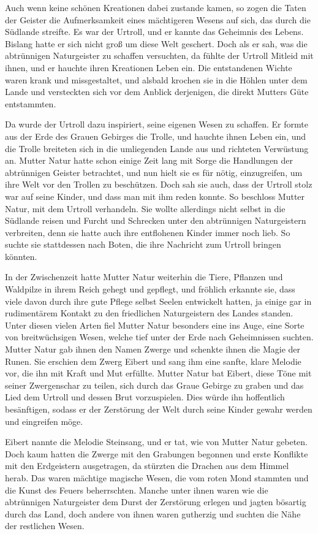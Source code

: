 \documentclass[10pt, a4paper, oneside]{book}
\begin{document}
Auch wenn keine schönen Kreationen dabei zustande kamen, so zogen die Taten der Geister die Aufmerksamkeit eines mächtigeren Wesens auf sich, das durch die Südlande streifte. Es war der Urtroll, und er kannte das Geheimnis des Lebens. Bislang hatte er sich nicht groß um diese Welt geschert. Doch als er sah, was die abtrünnigen Naturgeister zu schaffen versuchten, da fühlte der Urtroll Mitleid mit ihnen, und er hauchte ihren Kreationen Leben ein. Die entstandenen Wichte waren krank und missgestaltet, und alsbald krochen sie in die Höhlen unter dem Lande und versteckten sich vor dem Anblick derjenigen, die direkt Mutters Güte entstammten.

Da wurde der Urtroll dazu inspiriert, seine eigenen Wesen zu schaffen. Er formte aus der Erde des Grauen Gebirges die Trolle, und hauchte ihnen Leben ein, und die Trolle breiteten sich in die umliegenden Lande aus und richteten Verwüstung an. Mutter Natur hatte schon einige Zeit lang mit Sorge die Handlungen der abtrünnigen Geister betrachtet, und nun hielt sie es für nötig, einzugreifen, um ihre Welt vor den Trollen zu beschützen. Doch sah sie auch, dass der Urtroll stolz war auf seine Kinder, und dass man mit ihm reden konnte. So beschloss Mutter Natur, mit dem Urtroll verhandeln. Sie wollte allerdings nicht selbst in die Südlande reisen und Furcht und Schrecken unter den abtrünnigen Naturgeistern verbreiten, denn sie hatte auch ihre entflohenen Kinder immer noch lieb. So suchte sie stattdessen nach Boten, die ihre Nachricht zum Urtroll bringen könnten.

In der Zwischenzeit hatte Mutter Natur weiterhin die Tiere, Pflanzen und Waldpilze in ihrem Reich gehegt und gepflegt, und fröhlich erkannte sie, dass viele davon durch ihre gute Pflege selbst Seelen entwickelt hatten, ja einige gar in rudimentärem Kontakt zu den friedlichen Naturgeistern des Landes standen. Unter diesen vielen Arten fiel Mutter Natur besonders eine ins Auge, eine Sorte von breitwüchsigen Wesen, welche tief unter der Erde nach Geheimnissen suchten. Mutter Natur gab ihnen den Namen Zwerge und schenkte ihnen die Magie der Runen. Sie erschien dem Zwerg Eibert und sang ihm eine sanfte, klare Melodie vor, die ihn mit Kraft und Mut erfüllte. Mutter Natur bat Eibert, diese Töne mit seiner Zwergenschar zu teilen, sich durch das Graue Gebirge zu graben und das Lied dem Urtroll und dessen Brut vorzuspielen. Dies würde ihn hoffentlich besänftigen, sodass er der Zerstörung der Welt durch seine Kinder gewahr werden und eingreifen möge.

Eibert nannte die Melodie Steinsang, und er tat, wie von Mutter Natur gebeten. Doch kaum hatten die Zwerge mit den Grabungen begonnen und erste Konflikte mit den Erdgeistern ausgetragen, da stürzten die Drachen aus dem Himmel herab. Das waren mächtige magische Wesen, die vom roten Mond stammten und die Kunst des Feuers beherrschten. Manche unter ihnen waren wie die abtrünnigen Naturgeister dem Durst der Zerstörung erlegen und jagten bösartig durch das Land, doch andere von ihnen waren gutherzig und suchten die Nähe der restlichen Wesen.
\end{document}
